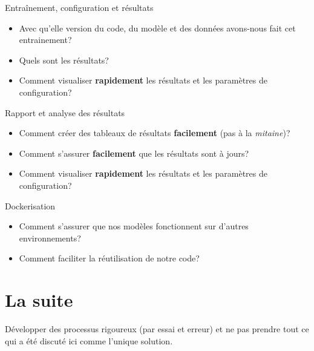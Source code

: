 \documentclass[aspectratio=169,10pt,xcolor=x11names,english,french]{beamer}
\begin{document}
	\begin{frame}{Entraînement, configuration et résultats}
		\begin{itemize}
			\item<1-> Avec qu'elle version du code, du modèle et des données avons-nous fait cet entrainement?
			\item<2-> Quels sont les résultats?
			\item<3-> Comment visualiser \textbf{rapidement} les résultats et les paramètres de configuration?
		\end{itemize}
	\end{frame}
	
	\begin{frame}{Rapport et analyse des résultats}
		\begin{itemize}
			\item<1-> Comment créer des tableaux de résultats \textbf{facilement} (pas à la \textit{mitaine})?
			\item<2-> Comment s'assurer \textbf{facilement} que les résultats sont à jours?
			\item<3-> Comment visualiser \textbf{rapidement} les résultats et les paramètres de configuration?
		\end{itemize}
	\end{frame}
	
	\begin{frame}{Dockerisation}
		\begin{itemize}
			\item<1-> Comment s'assurer que nos modèles fonctionnent sur d'autres environnements?
			\item<2-> Comment faciliter la réutilisation de notre code?
		\end{itemize}
	\end{frame}
	
	
	
	\section{La suite}
	\begin{frame}
		Développer des processus rigoureux (par essai et erreur) et ne pas prendre tout ce qui a été discuté ici comme l'unique solution.
	\end{frame}
	
\end{document}
